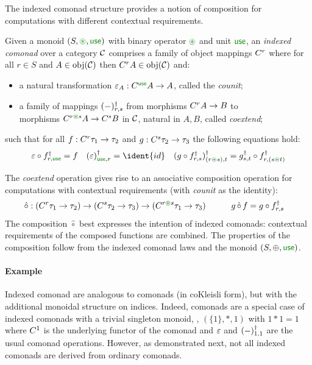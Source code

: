 The indexed comonad structure provides a notion of composition
for computations with different contextual requirements.
\begin{definition}
Given a monoid $(S, \cseq, \cunit)$ with binary operator $\cseq$ and
unit $\cunit$, an \emph{indexed comonad} over a category $\mathcal{C}$
comprises a family of object mappings $C^{r}$ where for all $r \in S$ and $A \in \textnormal{obj}(\mathcal{C})$ then 
$C^{r} A \in \textnormal{obj}(\mathcal{C})$ and:
\begin{itemize}
\item a natural transformation $\counit_A : \iftor{\cunit} A \rightarrow A$, called the \emph{counit};
\item a family of mappings $(-)^\dagger_{r, s}$ from morphisms $C^{r} A \rightarrow B$ to \\ morphisms $\iftor{r \cseq{} s} A
  \rightarrow \iftor s B$ in $\mathcal{C}$, natural in $A,B$, called
  \emph{coextend};
\end{itemize}
%
\noindent
such that for all $f : C^{r} \tau_1 \rightarrow \tau_2$ and $g : C^{s} \tau_2 \rightarrow \tau_3$ 
the following equations hold:
%
\renewcommand{\arraycolsep}{1.5em}
\begin{align*}
\begin{array}{ccc}
\counit \circ \cobind{f}{r, \cunit} = f & 
\cobind{{(\counit)}}{\cunit, r} = \ident{id} & 
\cobind{(g \circ \cobind{f}{r, s})}{(r \cseq s), t} = \cobind{g}{s, t} \circ \cobind{f}{r, (s \cseq t)} \\
\end{array}
\end{align*}
\end{definition}
%
The \emph{coextend} operation gives rise to an associative composition operation for
computations with contextual requirements (with \emph{counit} as the identity):
%
\[
\hat{\circ} : (\iftor r \tau_1 \rightarrow \tau_2) \rightarrow (\iftor s \tau_2 \rightarrow \tau_3) 
  \rightarrow (\iftor{r \cseq s} \tau_1 \rightarrow \tau_3) \quad\quad\quad
g \, \hat{\circ} \, f = g \circ f^\dagger_{r,s}\quad
\]
%
The composition $\hat{\circ}$ best expresses the intention
of indexed comonads: contextual requirements of the composed
functions are combined. The properties of
the composition follow from the indexed comonad laws and the 
monoid $(S, \oplus, \cunit)$.

\paragraph{Example}
Indexed comonad are analogous to comonads (in coKleisli form), but
with the additional monoidal structure on indices.  Indeed, comonads
are a special case of indexed comonads with a trivial singleton
monoid, \eg{}, $(\{1\}, \ast, 1)$ with $1 \ast 1 = 1$ where $C^{1}$
is the underlying functor of the comonad and $\varepsilon$ and
$(-)^\dagger_{1, 1}$ are the usual comonad operations.
However, as demonstrated next, not all indexed comonads are derived from ordinary comonads.

